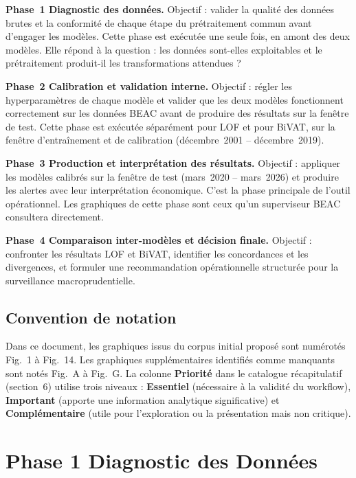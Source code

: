 \documentclass[12pt,a4paper]{article}
\begin{document}
\textbf{Phase~1  Diagnostic des données.} Objectif : valider la qualité
des données brutes et la conformité de chaque étape du prétraitement commun
avant d'engager les modèles. Cette phase est exécutée une seule fois, en
amont des deux modèles. Elle répond à la question : les données sont-elles
exploitables et le prétraitement produit-il les transformations attendues ?

\textbf{Phase~2  Calibration et validation interne.} Objectif : régler
les hyperparamètres de chaque modèle et valider que les deux modèles
fonctionnent correctement sur les données BEAC avant de produire des
résultats sur la fenêtre de test. Cette phase est exécutée séparément pour
LOF et pour BiVAT, sur la fenêtre d'entraînement et de calibration
(décembre~2001 -- décembre~2019).

\textbf{Phase~3  Production et interprétation des résultats.} Objectif :
appliquer les modèles calibrés sur la fenêtre de test (mars~2020 --
mars~2026) et produire les alertes avec leur interprétation économique.
C'est la phase principale de l'outil opérationnel. Les graphiques de cette
phase sont ceux qu'un superviseur BEAC consultera directement.

\textbf{Phase~4  Comparaison inter-modèles et décision finale.} Objectif :
confronter les résultats LOF et BiVAT, identifier les concordances et les
divergences, et formuler une recommandation opérationnelle structurée pour
la surveillance macroprudentielle.

\subsection{Convention de notation}

Dans ce document, les graphiques issus du corpus initial proposé sont
numérotés Fig.~1 à Fig.~14. Les graphiques supplémentaires identifiés
comme manquants sont notés Fig.~A à Fig.~G. La colonne \textbf{Priorité}
dans le catalogue récapitulatif (section~6) utilise trois niveaux :
\textbf{Essentiel} (nécessaire à la validité du workflow), \textbf{Important}
(apporte une information analytique significative) et \textbf{Complémentaire}
(utile pour l'exploration ou la présentation mais non critique).

\section{Phase 1  Diagnostic des Données}
\end{document}
